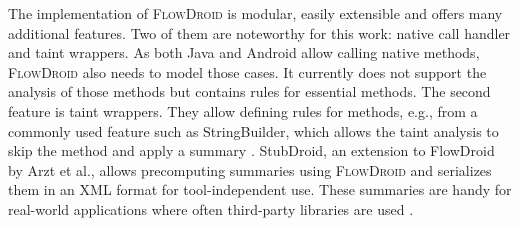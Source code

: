 \documentclass[../draft.tex]{subfiles}
\begin{document}
    The implementation of \textsc{FlowDroid} is modular, easily extensible and offers many additional features. 
    Two of them are noteworthy for this work: native call handler and taint wrappers. 
    As both Java and Android allow calling native methods, \textsc{FlowDroid} also needs to model those cases. 
    It currently does not support the analysis of those methods but contains rules for essential methods. 
    The second feature is taint wrappers. 
    They allow defining rules for methods, e.g., from a commonly used feature such as StringBuilder, which allows the taint analysis to skip the method and apply a summary \cite{Arzt2014}. 
    StubDroid, an extension to FlowDroid by Arzt et al., allows precomputing summaries using \textsc{FlowDroid} and serializes them in an XML format for tool-independent use. 
    These summaries are handy for real-world applications where often third-party libraries are used \cite{Arzt2016}.
\end{document}
